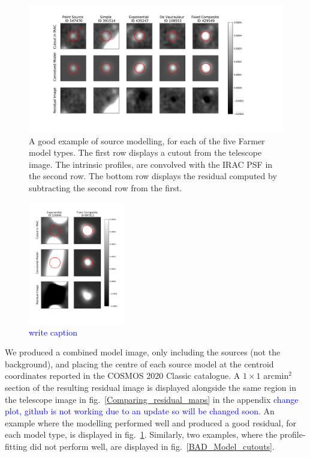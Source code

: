 \begin{figure}[h!]
    \centering
    \includegraphics[trim={3cm 2.5cm 5cm 1.5cm},clip,scale=0.5]{Code/Saved_Figures/Model_cutouts.pdf}
    \caption{A good example of source modelling, for each of the five Farmer model types. The first row displays a cutout from the telescope image. The intrinsic profiles, are convolved with the IRAC PSF in the second row. The bottom row displays the residual computed by subtracting the second row from the first.}
    \label{Model_cutouts}
\end{figure}

\begin{figure}
    \centering %
    \includegraphics[trim={1cm 2.5cm 2cm 1.5cm},clip,width=0.38\textwidth]{Code/Saved_Figures/BAD_model_cutouts.pdf}
    \caption{\textcolor{blue}{write caption}}
    \label{Two examples where the modelling of the sources was not as succesful.}  
\end{figure}

We produced a combined model image, only including the sources (not the background), and placing the centre of each source model at the centroid coordinates reported in the COSMOS 2020 Classic catalogue. A $1\times1$ arcmin$^2$ section of the resulting residual image is displayed alongside the same region in the telescope image in fig.~\ref{Comparing_residual_maps} in the appendix \textcolor{blue}{change plot, github is not working due to an update so will be changed soon}. An example where the modelling performed well and produced a good residual, for each model type, is displayed in fig.~\ref{Model_cutouts}. Similarly, two examples, where the profile-fitting did not perform well, are displayed in fig.~\ref{BAD_Model_cutouts}.

